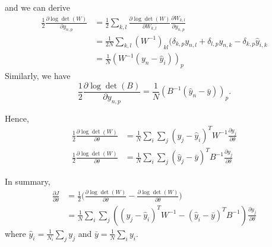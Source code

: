 \documentclass{article}
\begin{document}
and we can derive
\begin{align}
\frac{1}{2}\frac{\partial \log\det(W)}{\partial y_{n,p}}
  &= \frac{1}{2}\sum_{k,l}\frac{\partial \log\det(W)}{\partial W_{k,l}}\frac{\partial W_{k,l}}{\partial y_{n,p}} \\
  &= \frac{1}{2N}\sum_{k,l}(W^{-1})_{kl}(\delta_{k,p}y_{n,l} + \delta_{l,p}y_{n,k} - \delta_{k,p}\hat{y}_{i,k} \\
  &= \frac{1}{N}(W^{-1}(y_n - \hat{y}_i))_p
\end{align}
Similarly, we have
\begin{equation}
\frac{1}{2}\frac{\partial \log\det(B)}{\partial y_{n,p}} = \frac{1}{N}(B^{-1}(\hat{y}_n - \bar{y}))_p.
\end{equation}

Hence,
\begin{align}
\frac{1}{2}\frac{\partial \log\det(W)}{\partial \theta} &=  \frac{1}{N}\sum_i\sum_j(y_j-\hat{y}_i)^TW^{-1}\frac{\partial y_j}{\partial \theta} \\
\frac{1}{2}\frac{\partial \log\det(W)}{\partial \theta} &=  \frac{1}{N}\sum_i\sum_j(\hat{y}_j-\bar{y})^TB^{-1}\frac{\partial y_j}{\partial \theta}
\end{align}

In summary,
\begin{align}
\frac{\partial J}{\partial \theta} &= \frac{1}{2}\Bigg(\frac{\partial \log\det(W)}{\partial \theta} - \frac{\partial \log\det(W)}{\partial \theta}\Bigg) \\
 &= \frac{1}{N}\sum_i\sum_j((y_j - \hat{y}_i)^TW^{-1} - (\hat{y}_i - \bar{y})^TB^{-1})\frac{\partial y_j}{\partial \theta}
\end{align}
where $\hat{y}_i = \frac{1}{N_i}\sum_j y_j$ and $\bar{y} = \frac{1}{N}\sum_i y_i$.
\end{document}
